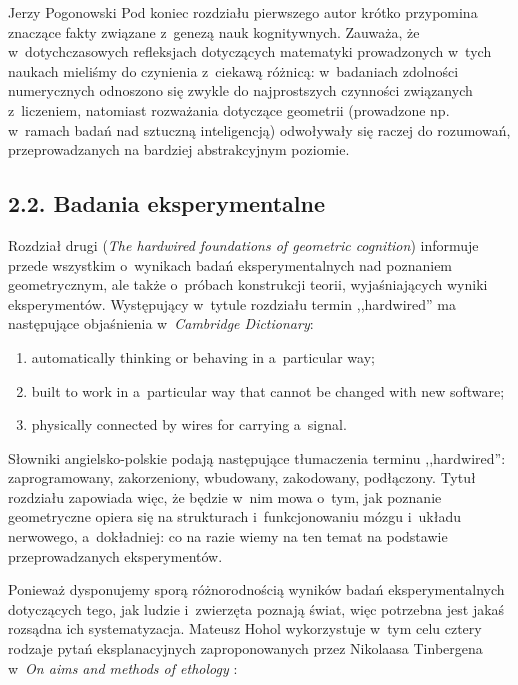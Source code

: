 \begin{newrevplenv}{Jerzy Pogonowski}
Pod koniec rozdziału pierwszego autor krótko przypomina znaczące
fakty związane z~genezą nauk kognitywnych. Zauważa, że w~dotychczasowych refleksjach dotyczących matematyki prowadzonych w~tych naukach mieliśmy do czynienia z~ciekawą różnicą: w~badaniach
zdolności numerycznych odnoszono się zwykle do najprostszych
czynności związanych z~liczeniem, natomiast rozważania dotyczące
geometrii (prowadzone np. w~ramach badań nad sztuczną
inteligencją) odwoływały się raczej do rozumowań, przeprowadzanych
na bardziej abstrakcyjnym poziomie.

\subsection{2.2. Badania eksperymentalne}

Rozdział drugi ({\em The hardwired foundations of geometric
cognition}) informuje przede wszystkim o~wynikach badań
eksperymentalnych nad poznaniem geometrycznym, ale także o~próbach
konstrukcji teorii, wyjaśniających wyniki eksperymentów.
Występujący w~tytule rozdziału termin ,,hardwired'' ma następujące
objaśnienia w~{\em Cambridge Dictionary}:

\begin{enumerate}

\item automatically thinking or behaving in a~particular way;

\item built to work in a~particular way that cannot be changed
with new software;

\item physically connected by wires for carrying a~signal.

\end{enumerate}

Słowniki angielsko-polskie podają następujące tłumaczenia terminu
,,hard\-wired'': zaprogramowany, zakorzeniony, wbudowany,
zakodowany, podłączony. Tytuł rozdziału zapowiada więc, że będzie
w~nim mowa o~tym, jak poznanie geometryczne opiera się na
strukturach i~funkcjonowaniu mózgu i~układu nerwowego, a~dokładniej: co na razie wiemy na ten temat na podstawie
przeprowadzanych eksperymentów.

Ponieważ dysponujemy sporą różnorodnością wyników badań
eksperymentalnych dotyczących tego, jak ludzie i~zwierzęta poznają
świat, więc potrzebna jest jakaś rozsądna ich systematyzacja.
Mateusz Hohol wykorzystuje w~tym celu cztery rodzaje pytań
eksplanacyjnych zaproponowanych przez Nikolaasa Tinbergena w~\textit{On
aims and methods of ethology} \parencite{tinbergen_aims_1963}:
\begin{center}
\begin{small}
\begin{tabular}{|l|l|l|}


\end{tabular}
\end{small}
\end{center}
\end{newrevplenv}
